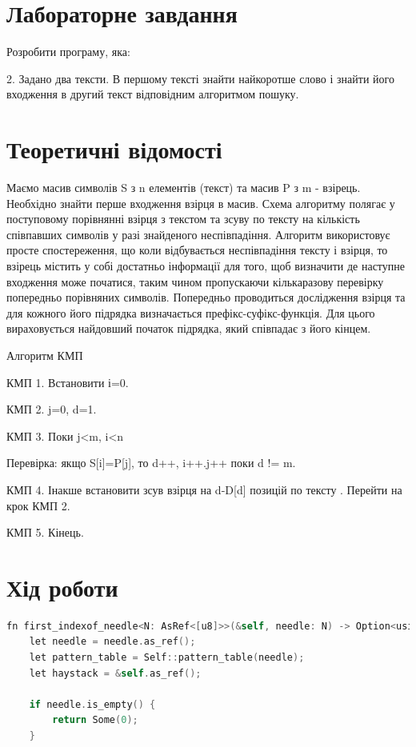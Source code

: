 \documentclass{article}
\begin{document}
\begin{normalsize}
		\section*{Лабораторне завдання}

	Розробити програму, яка:
		\begin{center}
			2.       Задано два тексти. В першому тексті знайти найкоротше слово і знайти його входження в другий текст відповідним алгоритмом пошуку.
		\end{center}
		
		\section*{Теоретичні відомості}
		Маємо масив символів S з n елементів (текст) та масив P з m - взірець. Необхідно знайти перше входження взірця в масив. Схема алгоритму полягає у поступовому порівнянні взірця з текстом та зсуву по тексту на кількість співпавших символів у разі знайденого неспівпадіння. Алгоритм використовує просте спостереження, що коли відбувається неспівпадіння тексту і взірця, то взірець містить у собі достатньо інформації для того, щоб визначити де наступне входження може початися, таким чином пропускаючи кількаразову перевірку попередньо порівняних символів. Попередньо проводиться дослідження взірця та для кожного його підрядка визначається префікс-суфікс-функція. Для цього вираховується найдовший початок підрядка, який співпадає з його кінцем.
		
		Алгоритм КМП
		
		КМП 1. Встановити і=0.
		
		КМП 2. j=0, d=1.
		
		КМП 3. Поки j<m, i<n
		
		Перевірка: якщо S[i]=P[j], то d++, i++.j++ поки d != m.
		
		КМП 4. Інакше встановити зсув взірця на d-D[d] позицій по тексту . Перейти на крок КМП 2.
		
		КМП 5. Кінець.
		
		\section*{Хід роботи}
		\begin{lstlisting}[language=C]
    fn first_indexof_needle<N: AsRef<[u8]>>(&self, needle: N) -> Option<usize> {
	let needle = needle.as_ref();
	let pattern_table = Self::pattern_table(needle);
	let haystack = &self.as_ref();
	
	if needle.is_empty() {
		return Some(0);
	}
	

\end{lstlisting}
\end{normalsize}
\end{document}
